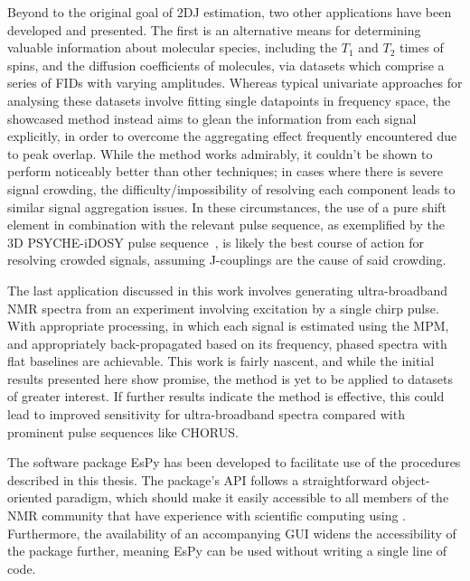 Beyond to the original goal of \ac{2DJ} estimation, two other applications
have been developed and presented. The first is an alternative means for
determining valuable information about molecular species, including the $T_1$
and $T_2$ times of spins, and the diffusion coefficients of molecules, via
datasets which comprise a series of \acp{FID} with varying amplitudes. Whereas
typical univariate
approaches for analysing these datasets involve fitting single datapoints in
frequency space, the showcased method instead aims to glean the
information from each signal explicitly, in order to overcome the aggregating
effect frequently encountered due to peak overlap. While the method works
admirably,
it couldn't be shown to perform noticeably better than other techniques; in
cases where there is severe signal crowding, the difficulty/impossibility of
resolving each component leads to similar signal aggregation issues.
In these circumstances, the use of a pure shift element in
combination with the relevant pulse sequence, as exemplified by the
\ac{3D} \ac{PSYCHE}-i\ac{DOSY} pulse sequence~\cite{Foroozandeh2016}, is likely
the best course of action for resolving crowded signals, assuming J-couplings
are the cause of said crowding.

The last application discussed in this work involves generating ultra-broadband
\ac{NMR} spectra from an experiment involving excitation by a single chirp
pulse. With appropriate processing, in which each signal is estimated using the
\ac{MPM}, and appropriately back-propagated based on its frequency, phased
spectra with flat baselines are achievable.
This work is fairly nascent, and while the initial results presented here show
promise, the method is yet to be applied to datasets of greater interest. If
further results indicate the method is effective, this could lead to improved
sensitivity for ultra-broadband spectra compared with prominent pulse sequences
like \ac{CHORUS}.

The software package \ac{EsPy} has been developed to facilitate use of the
procedures described in this thesis. The package's \ac{API} follows a
straightforward object-oriented paradigm, which should make it easily
accessible to all members of the \ac{NMR} community that have experience with
scientific computing using \Python\!. Furthermore, the availability of an
accompanying \ac{GUI} widens the accessibility of the package further, meaning
\ac{EsPy} can be used without writing a single line of code.

